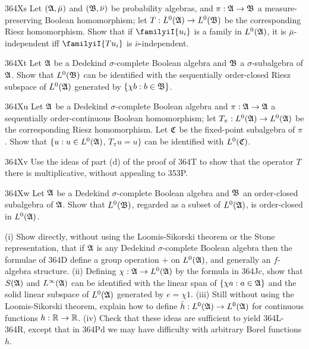{\spheader 364Xs Let $(\frak A,\bar\mu)$ and $(\frak B,\bar\nu)$ be
probability algebras, and $\pi:\frak A\to\frak B$ a measure-preserving
Boolean homomorphism;  let $T:L^0(\frak A)\to L^0(\frak B)$ be the
corresponding Riesz homomorphism.   Show that if $\familyiI{u_i}$ is a
family in $L^0(\frak A)$, it is $\bar\mu$-independent iff
$\familyiI{Tu_i}$ is $\bar\nu$-independent.

\sqheader 364Xt Let $\frak A$ be a Dedekind $\sigma$-complete Boolean
algebra and $\frak B$ a $\sigma$-subalgebra of $\frak A$.   Show that
$L^0(\frak B)$ can be identified with the sequentially order-closed
Riesz subspace of $L^0(\frak A)$ generated by $\{\chi b:b\in\frak B\}$.

\spheader 364Xu Let $\frak A$ be a Dedekind $\sigma$-complete Boolean
algebra and $\pi:\frak A\to\frak A$ a sequentially order-continuous
Boolean homomorphism;  let $T_{\pi}:L^0(\frak A)\to L^0(\frak A)$ be the
corresponding Riesz homomorphism.   Let $\frak C$ be the fixed-point
subalgebra of $\pi$.   Show that $\{u:u\in L^0(\frak A)$, $T_{\pi}u=u\}$
can be identified with $L^0(\frak C)$.

\spheader 364Xv Use the ideas of part (d) of the proof of 364T to show
that the operator $T$ there is multiplicative, without appealing to
353P.

\spheader 364Xw Let $\frak A$ be a Dedekind $\sigma$-complete
Boolean algebra and $\frak B$ an order-closed subalgebra of $\frak A$.
Show that $L^0(\frak B)$, regarded as a subset of $L^0(\frak A)$,
is order-closed in $L^0(\frak A)$.

%
(i) Show directly, without using the Loomis-Sikorski theorem or the
Stone representation,
that if $\frak A$ is any Dedekind $\sigma$-complete Boolean algebra then
the formulae of 364D define a group operation $+$ on $L^0(\frak A)$, and
generally an $f$-algebra structure.   (ii) Defining
$\chi:\frak A\to L^0(\frak A)$ by the formula in 364Jc, show that
$S(\frak A)$ and $L^{\infty}(\frak A)$ can be identified with the linear
span of $\{\chi a:a\in\frak A\}$ and the solid linear subspace of
$L^0(\frak A)$ generated by $e=\chi 1$.   (iii) Still without using the
Loomis-Sikorski theorem, explain how to define
$\bar h:L^0(\frak A)\to L^0(\frak A)$ for continuous functions
$h:\Bbb R\to\Bbb R$.   (iv) Check that these ideas are sufficient to yield
364L-364R, %
except that in 364Pd we may have difficulty with arbitrary
Borel functions $h$.

}
